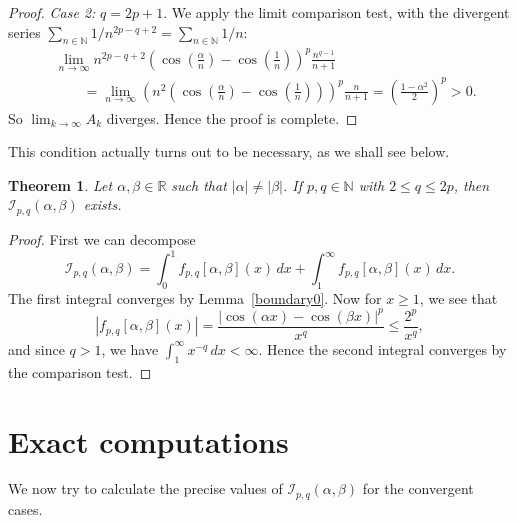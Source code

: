 \documentclass[12pt, reqno]{amsart}
\theoremstyle{plain}
\newtheorem{theorem}{Theorem}[section]
\theoremstyle{definition}
\begin{document}
\begin{proof}
    {\it Case 2:}  $q=2p+1$. %
    We apply the limit comparison test, with the divergent series  $\sum_{n\in\mathbb{N}}1/n^{2p-q+2}=\sum_{n\in\mathbb{N}}1/n$:
    \begin{align*}
        &\lim_{n\to\infty}n^{2p-q+2}\left(\cos\left(\frac{\alpha}{n}\right)-\cos\left(\frac{1}{n}\right)\right)^p\frac{n^{q-1}}{n+1} \\
        &\qquad=\lim_{n\to\infty}\left(n^2\left(\cos\left(\frac{\alpha}{n}\right)-\cos\left(\frac{1}{n}\right)\right)\right)^p\frac{n}{n+1}=\left(\frac{1-\alpha^2}{2}\right)^p>0.
    \end{align*}
    So $\lim_{k\to\infty} A_k$ diverges.
    Hence the proof is complete.
\end{proof}

This condition actually turns out to be necessary, as we shall see below.



\begin{theorem}\label{compar}
     Let $\alpha, \beta\in\mathbb{R}$ such that $|\alpha|\ne|\beta|$. If $p, q\in\mathbb{N}$ with $2\le q\le 2p$, then $\mathcal{I}_{p, q}(\alpha, \beta)$ exists.
\end{theorem}
\begin{proof}
    First we can decompose
    \[
\mathcal I_{p,q}(\alpha,\beta)
=\int_0^1 f_{p,q}[\alpha,\beta](x)\,dx+\int_1^\infty f_{p,q}[\alpha,\beta](x)\,dx.
\]
The first integral converges by Lemma~\ref{boundary0}. Now for $x\ge 1$, we see that
\[
|f_{p,q}[\alpha,\beta](x)|
=\frac{|\cos(\alpha x)-\cos(\beta x)|^p}{x^q}
\le \frac{2^p}{x^q},
\]
and since $q>1$, we have $\int_1^\infty x^{-q}\,dx<\infty$. Hence the second integral converges by the comparison test. 
\end{proof}






\section{Exact computations}\label{sec4}

We now try to calculate the precise values of $\mathcal{I}_{p, q}(\alpha, \beta)$ for the convergent cases.
\end{document}
